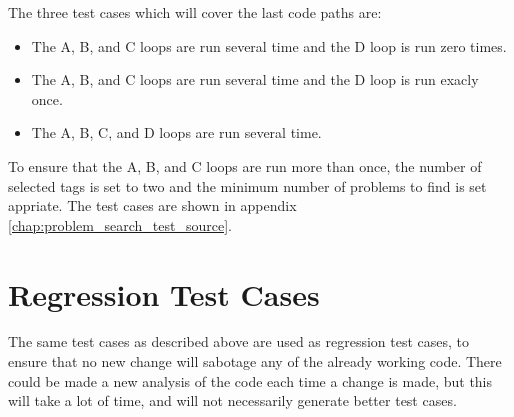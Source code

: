The three test cases which will cover the last code paths are:
\begin{itemize}
	\item The A, B, and C loops are run several time and the D loop is run zero times.
	\item The A, B, and C loops are run several time and the D loop is run exacly once.
	\item The A, B, C, and D loops are run several time.
\end{itemize}
To ensure that the A, B, and C loops are run more than once, the number of selected tags is set to two and the minimum number of problems to find is set appriate.
The test cases are shown in appendix \ref{chap:problem_search_test_source}.

\section{Regression Test Cases}
\label{sec:regression_problem_search}
The same test cases as described above are used as regression test cases, to ensure that no new change will sabotage any of the already working code.
There could be made a new analysis of the code each time a change is made, but this will take a lot of time, and will not necessarily generate better test cases.
